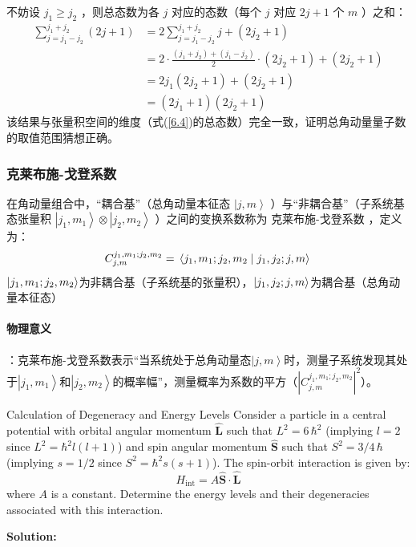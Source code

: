 不妨设 \(j_1 \geq j_2\) ，则总态数为各 \(j\) 对应的态数（每个 \(j\) 对应 \(2j + 1\) 个 \(m\) ）之和：
\begin{align}
	\sum_{j = j_1 - j_2}^{j_1 + j_2} (2j + 1) &= 2\sum_{j = j_1 - j_2}^{j_1 + j_2} j + (2j_2 + 1) \\
	&= 2 \cdot \frac{(j_1 + j_2) + (j_1 - j_2)}{2} \cdot (2j_2 + 1) + (2j_2 + 1) \\
	&= 2j_1(2j_2 + 1) + (2j_2 + 1) \\
	&= (2j_1 + 1)(2j_2 + 1)
\end{align}
该结果与张量积空间的维度（式(\ref{6.4})的总态数）完全一致，证明总角动量量子数的取值范围猜想正确。


\subsubsection{克莱布施-戈登系数}
在角动量组合中，“耦合基”（总角动量本征态 \(\left| j, m \right>\) ）与“非耦合基”（子系统基态张量积 \(\left| j_1, m_1 \right> \otimes \left| j_2, m_2 \right>\) ）之间的变换系数称为 \(\textbf{克莱布施-戈登系数}\) ，定义为：
\begin{equation}
	C_{j,m}^{{j_1},{m_1};{j_2},{m_2}} = {\rm{ }}\left\langle {{{j_1},{m_1};{j_2},{m_2}}}
	\mathrel{\left | {\vphantom {{{j_1},{m_1};{j_2},{m_2}} {{j_1},{j_2};j,m}}}
		\right. \kern-\nulldelimiterspace}
	{{{j_1},{j_2};j,m}} \right\rangle {\rm{  }}
\end{equation}
\(\ket{j_1, m_1; j_2, m_2}\)为非耦合基（子系统基的张量积），\(\ket{j_1,j_2;j, m}\)为耦合基（总角动量本征态）

\paragraph{物理意义}：克莱布施-戈登系数表示“当系统处于总角动量态\(\left| j, m \right>\)时，测量子系统发现其处于\(\left| j_1, m_1 \right>\)和\(\left| j_2, m_2 \right>\)的概率幅”，测量概率为系数的平方（\(|C_{j,m}^{j_1,m_1;j_2,m_2}|^2\)）。
\begin{problembox}{Calculation of Degeneracy and Energy Levels}
	Consider a particle in a central potential with orbital angular momentum $\hat{\mathbf{L}}$ such that $L^2 = 6\,\hbar^2$ (implying $l=2$ since $L^2 = \hbar^2 l(l+1)$) and spin angular momentum $\hat{\mathbf{S}}$ such that $S^2 = 3/4\,\hbar$ (implying $s=1/2$ since $S^2 = \hbar^2 s(s+1)$). The spin-orbit interaction is given by:
	\[
	H_{\text{int}} = A \hat{\mathbf{S}} \cdot \hat{\mathbf{L}}
	\]
	where $A$ is a constant. Determine the energy levels and their degeneracies associated with this interaction.
\end{problembox}
\textbf{Solution:}

